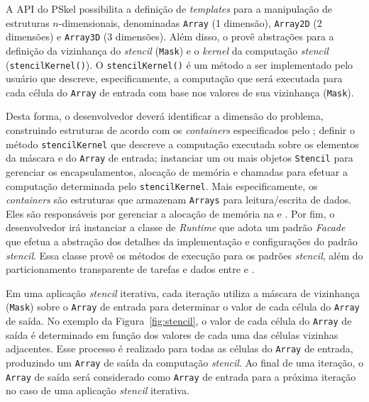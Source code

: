 A API do PSkel possibilita a definição de \textit{templates} para a manipulação
de estruturas $n$-dimensionais, denominadas \texttt{Array} (1 dimensão),
\texttt{Array2D} (2 dimensões) e \texttt{Array3D} (3 dimensões). Além disso, o
\fw provê abstrações para a definição da vizinhança do \textit{stencil} (\texttt{Mask})
e o \textit{kernel} da computação \textit{stencil} (\texttt{stencilKernel()}). O
\texttt{stencilKernel()} é um método a ser implementado pelo usuário que
descreve, especificamente, a computação que será executada para cada célula do
\texttt{Array} de entrada com base nos valores de sua vizinhança (\texttt{Mask}).

Desta forma, o desenvolvedor deverá identificar a dimensão do problema,
construindo estruturas de acordo com os \textit{containers} especificados pelo
\fw; definir o método \texttt{stencilKernel} que descreve a computação executada
sobre os elementos da máscara e do \texttt{Array} de entrada; instanciar um ou
mais objetos \texttt{Stencil} para gerenciar os encapsulamentos, alocação de
memória e chamadas para efetuar a computação determinada pelo
\texttt{stencilKernel}. Mais especificamente, os \textit{containers} são
estruturas que armazenam \texttt{Arrays} para leitura/escrita de dados. Eles são
responsáveis por gerenciar a alocação de memória na \cpu e \gpu.
Por fim, o desenvolvedor irá instanciar a classe de \textit{Runtime} que adota
um padrão \textit{Facade} que efetua a abstração dos detalhes da implementação e
configurações do padrão \textit{stencil}. Essa classe provê os métodos de execução para
os padrões \textit{stencil}, além do particionamento transparente de tarefas e dados
entre \cpu e \gpu.

%
Em uma aplicação \textit{stencil} iterativa, cada iteração utiliza a máscara de
vizinhança (\texttt{Mask}) sobre o \texttt{Array} de entrada para determinar o
valor de cada célula do \texttt{Array} de saída. No exemplo da
Figura~\ref{fig:stencil}, o valor de cada célula do \texttt{Array} de saída é
determinado em função dos valores de cada uma das células vizinhas adjacentes.
Esse processo é realizado para todas as células do \texttt{Array} de entrada,
produzindo um \texttt{Array} de saída da computação \textit{stencil}. Ao final de uma
iteração, o \texttt{Array} de saída será considerado como \texttt{Array} de
entrada para a próxima iteração no caso de uma aplicação \textit{stencil} iterativa.

